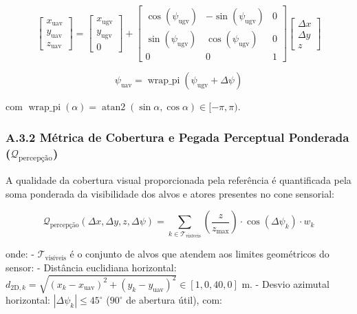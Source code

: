 \documentclass[
  brazilian,
  a4paper]{article}
\begin{document}
\[\begin{bmatrix} x_{\text{uav}} \\ y_{\text{uav}} \\ z_{\text{uav}} \end{bmatrix} = \begin{bmatrix} x_{\text{ugv}} \\ y_{\text{ugv}} \\ 0 \end{bmatrix} + \begin{bmatrix} \cos(\psi_{\text{ugv}}) & -\sin(\psi_{\text{ugv}}) & 0 \\ \sin(\psi_{\text{ugv}}) & \cos(\psi_{\text{ugv}}) & 0 \\ 0 & 0 & 1 \end{bmatrix} \begin{bmatrix} \Delta x \\ \Delta y \\ z \end{bmatrix}\]

\[\psi_{\text{uav}} = \operatorname{wrap\_pi}\left(\psi_{\text{ugv}} + \Delta \psi\right)\]

com
\(\operatorname{wrap\_pi}(\alpha) = \operatorname{atan2}(\sin \alpha, \cos \alpha) \in [-\pi, \pi)\).

\subsubsection{\texorpdfstring{A.3.2 Métrica de Cobertura e Pegada
Perceptual Ponderada
(\(\mathcal{Q}_{\text{percepção}}\))}{A.3.2 Métrica de Cobertura e Pegada Perceptual Ponderada (\textbackslash mathcal\{Q\}\_\{\textbackslash text\{percepção\}\})}}\label{a.3.2-muxe9trica-de-cobertura-e-pegada-perceptual-ponderada-mathcalq_textpercepuxe7uxe3o}

A qualidade da cobertura visual proporcionada pela referência é
quantificada pela soma ponderada da visibilidade dos alvos e atores
presentes no cone sensorial:

\[\mathcal{Q}_{\text{percepção}}(\Delta x, \Delta y, z, \Delta \psi) = \sum_{k \in \mathcal{T}_{\text{visíveis}}} \left(\frac{z}{z_{\text{max}}}\right) \cdot \cos(\Delta\psi_k) \cdot w_k\]

onde: - \(\mathcal{T}_{\text{visíveis}}\) é o conjunto de alvos que
atendem aos limites geométricos do sensor: - Distância euclidiana
horizontal:
\(d_{2\text{D}, k} = \sqrt{(x_k - x_{\text{uav}})^2 + (y_k - y_{\text{uav}})^2} \in [1{,}0, 40{,}0]\text{ m}\).
- Desvio azimutal horizontal: \(|\Delta\psi_k| \le 45^\circ\)
(\(90^\circ\) de abertura útil), com:
\end{document}
